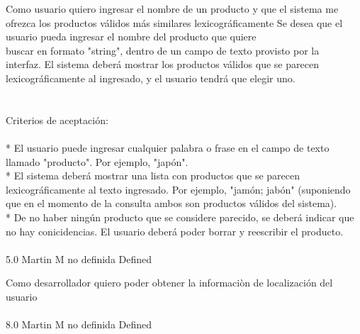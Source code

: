 \vspace{20pt}

	{Como usuario quiero ingresar el nombre de un producto y que el sistema me ofrezca los productos válidos más similares lexicográficamente} %
	{Se desea que el usuario pueda ingresar el nombre del producto que quiere\\
buscar en formato "string", dentro de un campo de texto provisto por la\\
interfaz. El sistema deberá mostrar los productos válidos que se parecen\\
lexicográficamente al ingresado, y el usuario tendrá que elegir uno.\\
\\
  \\
Criterios de aceptación:\\
\\
* El usuario puede ingresar cualquier palabra o frase en el campo de texto llamado "producto". Por ejemplo, "japón".  \\
* El sistema deberá mostrar una lista con productos que se parecen lexicográficamente al texto ingresado. Por ejemplo, "jamón; jabón" (suponiendo que en el momento de la consulta ambos son productos válidos del sistema).  \\
* De no haber ningún producto que se considere parecido, se deberá indicar que no hay conicidencias. El usuario deberá poder borrar y reescribir el producto.\\
\\
} %
	{} %
	{5.0} %
	{Martin M} %
	{no definida} %
	{Defined} %


\vspace{20pt}

	{Como desarrollador quiero poder obtener la informaciòn de localización del usuario} %
	{\\
\\
} %
	{} %
	{8.0} %
	{Martin M} %
	{no definida} %
	{Defined} %


\vspace{20pt}

